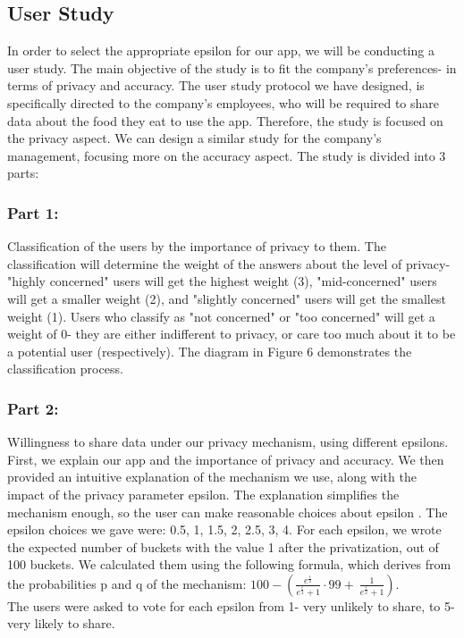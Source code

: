 \documentclass[sigconf]{acmart}
\begin{document}
\subsection{User Study} In order to select the appropriate epsilon for our app, we will be conducting a user study. The main objective of the study is to fit the company's preferences- in terms of privacy and accuracy.
The user study protocol we have designed, is specifically directed to the company's employees, who will be required to share data about the food they eat to use the app. Therefore, the study is focused on the privacy aspect. We can design a similar study for the company's management, focusing more on the accuracy aspect. The study is divided into 3 parts:
\subsubsection{Part 1:}  Classification of the users by the importance of privacy to them. The classification will determine the weight of the answers about the level of privacy- "highly concerned" users will get the highest weight (3), "mid-concerned" users will get a smaller weight (2), and "slightly concerned" users will get the smallest weight (1). Users who classify as "not concerned" or "too concerned" will get a weight of 0- they are either indifferent to privacy, or care too much about it to be a potential user (respectively).
The diagram in Figure 6 demonstrates the classification process.
\subsubsection{Part 2:} Willingness to share data under our privacy mechanism, using different epsilons. First, we explain our app and the importance of privacy and accuracy. We then provided an intuitive explanation of the mechanism we use, along with the impact of the privacy parameter epsilon. The explanation simplifies the mechanism enough, so the user can make reasonable choices about epsilon \cite{5_nanayakkara2023chances}. The epsilon choices we gave were: 0.5, 1, 1.5, 2, 2.5, 3, 4. For each epsilon, we wrote the expected number of buckets with the value 1 after the privatization, out of 100 buckets. We calculated them using the following formula, which derives from the probabilities p and q of the mechanism:  $100-\left(\frac{e^{\frac{\epsilon}{2}}}{e^{\frac{\epsilon}{2}}+1}\cdot99+\ \frac{1}{e^{\frac{\epsilon}{2}}+1}\right)$.\\
The users were asked to vote for each epsilon from 1- very unlikely to share, to 5- very likely to share.
\end{document}

